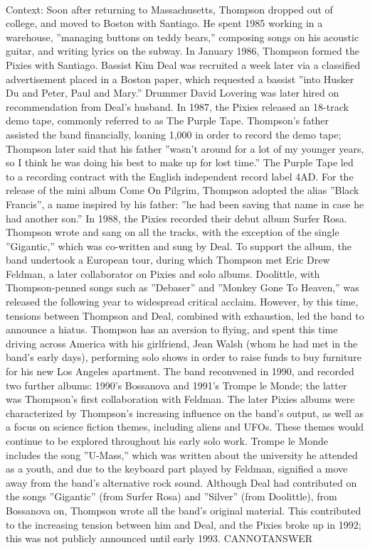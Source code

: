 \documentclass[11pt,a4paper, onecolumn]{article}
\begin{document}
\\ Context: Soon after returning to Massachusetts, Thompson dropped out of college, and moved to Boston with Santiago. He spent 1985 working in a warehouse, ''managing buttons on teddy bears,'' composing songs on his acoustic guitar, and writing lyrics on the subway. In January 1986, Thompson formed the Pixies with Santiago. Bassist Kim Deal was recruited a week later via a classified advertisement placed in a Boston paper, which requested a bassist ''into Husker Du and Peter, Paul and Mary.'' Drummer David Lovering was later hired on recommendation from Deal's husband. In 1987, the Pixies released an 18-track demo tape, commonly referred to as The Purple Tape. Thompson's father assisted the band financially, loaning  1,000 in order to record the demo tape; Thompson later said that his father ''wasn't around for a lot of my younger years, so I think he was doing his best to make up for lost time.'' The Purple Tape led to a recording contract with the English independent record label 4AD. For the release of the mini album Come On Pilgrim, Thompson adopted the alias ''Black Francis'', a name inspired by his father: ''he had been saving that name in case he had another son.'' In 1988, the Pixies recorded their debut album Surfer Rosa. Thompson wrote and sang on all the tracks, with the exception of the single ''Gigantic,'' which was co-written and sung by Deal. To support the album, the band undertook a European tour, during which Thompson met Eric Drew Feldman, a later collaborator on Pixies and solo albums. Doolittle, with Thompson-penned songs such as ''Debaser'' and ''Monkey Gone To Heaven,'' was released the following year to widespread critical acclaim. However, by this time, tensions between Thompson and Deal, combined with exhaustion, led the band to announce a hiatus. Thompson has an aversion to flying, and spent this time driving across America with his girlfriend, Jean Walsh (whom he had met in the band's early days), performing solo shows in order to raise funds to buy furniture for his new Los Angeles apartment. The band reconvened in 1990, and recorded two further albums: 1990's Bossanova and 1991's Trompe le Monde; the latter was Thompson's first collaboration with Feldman. The later Pixies albums were characterized by Thompson's increasing influence on the band's output, as well as a focus on science fiction themes, including aliens and UFOs. These themes would continue to be explored throughout his early solo work. Trompe le Monde includes the song ''U-Mass,'' which was written about the university he attended as a youth, and due to the keyboard part played by Feldman, signified a move away from the band's alternative rock sound. Although Deal had contributed on the songs ''Gigantic'' (from Surfer Rosa) and ''Silver'' (from Doolittle), from Bossanova on, Thompson wrote all the band's original material. This contributed to the increasing tension between him and Deal, and the Pixies broke up in 1992; this was not publicly announced until early 1993. CANNOTANSWER
\end{document}
